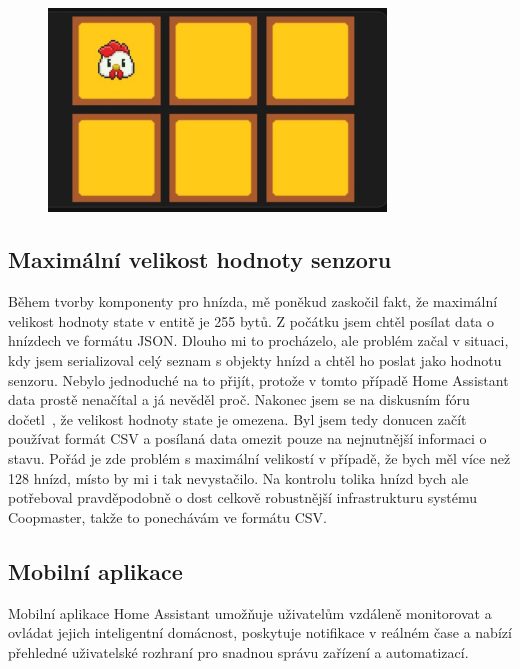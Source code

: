 \begin{figure}[H]
    \centering
    \includegraphics[width=0.8\textwidth]{img/homeassitant_custom_component}
    \label{fig:homeassitant_custom_component}
\end{figure}

\subsection*{Maximální velikost hodnoty senzoru}
Během tvorby komponenty pro hnízda, mě poněkud zaskočil fakt, že maximální velikost hodnoty state v entitě je 255 bytů.
Z počátku jsem chtěl posílat data o hnízdech ve formátu JSON.
Dlouho mi to procházelo, ale problém začal v situaci, kdy jsem serializoval celý seznam s objekty hnízd a chtěl ho poslat jako hodnotu senzoru.
Nebylo jednoduché na to přijít, protože v tomto případě Home Assistant data prostě nenačítal a já nevěděl proč.
Nakonec jsem se na diskusním fóru dočetl~\cite{HAStateLimit255}, že velikost hodnoty state je omezena.
Byl jsem tedy donucen začít používat formát CSV a posílaná data omezit pouze na nejnutnější informaci o stavu.
Pořád je zde problém s maximální velikostí v případě, že bych měl více než 128 hnízd, místo by mi i tak nevystačilo.
Na kontrolu tolika hnízd bych ale potřeboval pravděpodobně o dost celkově robustnější infrastrukturu systému Coopmaster, takže to ponechávám ve formátu CSV.

\subsection*{Mobilní aplikace}
Mobilní aplikace Home Assistant umožňuje uživatelům vzdáleně monitorovat a ovládat jejich inteligentní domácnost, poskytuje notifikace v reálném čase a nabízí přehledné uživatelské rozhraní pro snadnou správu zařízení a automatizací.


